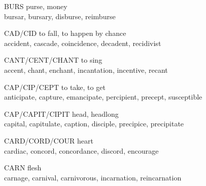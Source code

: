 \begin{flashcard}[Roots]{BURS}
purse, money\\
\vspace{0.2in}
bursar, bursary, disburse, reimburse\\
\end{flashcard}

\begin{flashcard}[Roots]{CAD/CID}
to fall, to happen by chance\\
\vspace{0.2in}
accident, cascade, coincidence, decadent, recidivist\\
\end{flashcard}

\begin{flashcard}[Roots]{CANT/CENT/CHANT}
to sing\\
\vspace{0.2in}
accent, chant, enchant, incantation, incentive, recant\\
\end{flashcard}

\begin{flashcard}[Roots]{CAP/CIP/CEPT}
to take, to get\\
\vspace{0.2in}
anticipate, capture, emancipate, percipient, precept, susceptible\\
\end{flashcard}

\begin{flashcard}[Roots]{CAP/CAPIT/CIPIT}
head, headlong\\
\vspace{0.2in}
 capital, capitulate, caption, disciple, precipice, precipitate\\
\end{flashcard}

\begin{flashcard}[Roots]{CARD/CORD/COUR}
heart\\
\vspace{0.2in}
 cardiac, concord, concordance, discord, encourage\\
\end{flashcard}

\begin{flashcard}[Roots]{CARN}
flesh\\
\vspace{0.2in}
 carnage, carnival, carnivorous, incarnation, reincarnation\\
\end{flashcard}

